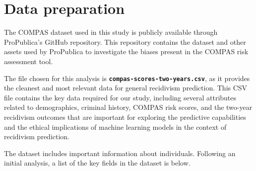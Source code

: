 

\section{Data preparation}

The COMPAS dataset used in this study is publicly available through ProPublica's GitHub repository. This repository contains the dataset and other assets used by ProPublica to investigate the biases present in the COMPAS risk assessment tool.

The file chosen for this analysis is \textbf{\texttt{compas-scores-two-years.csv}}, as it provides the cleanest and most relevant data for general recidivism prediction. This CSV file contains the key data required for our study, including several attributes related to demographics, criminal history, COMPAS risk scores, and the two-year recidivism outcomes that are important for exploring the predictive capabilities and the ethical implications of machine learning models in the context of recidivism prediction. 

The dataset includes important information about individuals. Following an initial analysis, a list of the key fields in the dataset is below.

